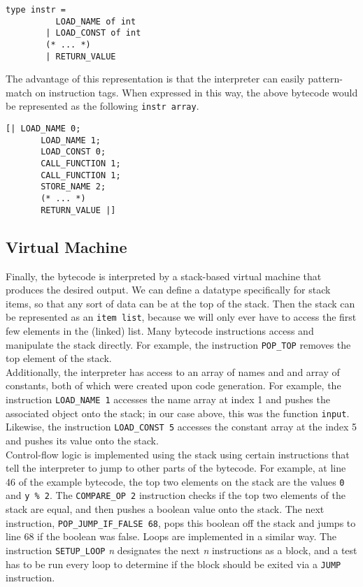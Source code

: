 \documentclass[11pt, twoside]{article}
\begin{document}
    \begin{lstlisting}[language=caml]
        type instr =
          LOAD_NAME of int
        | LOAD_CONST of int
        (* ... *)
        | RETURN_VALUE
    \end{lstlisting}
    The advantage of this representation is that the interpreter can easily pattern-match on instruction tags. When expressed in this way, the above bytecode would be represented as the following \texttt{instr array}.
    \begin{lstlisting}[language=caml]
    [| LOAD_NAME 0;
       LOAD_NAME 1;
       LOAD_CONST 0;
       CALL_FUNCTION 1;
       CALL_FUNCTION 1;
       STORE_NAME 2;
       (* ... *)
       RETURN_VALUE |]
    \end{lstlisting}
    \subsection{Virtual Machine}
    Finally, the bytecode is interpreted by a stack-based virtual machine that produces the desired output. We can define a datatype specifically for stack items, so that any sort of data can be at the top of the stack. Then the stack can be represented as an \texttt{item list}, because we will only ever have to access the first few elements in the (linked) list. Many bytecode instructions access and manipulate the stack directly. For example, the instruction \texttt{POP\_TOP} removes the top element of the stack.\\
    \indent Additionally, the interpreter has access to an array of names and and array of constants, both of which were created upon code generation. For example, the instruction \texttt{LOAD\_NAME 1} accesses the name array at index 1 and pushes the associated object onto the stack; in our case above, this was the function \texttt{input}. Likewise, the instruction \texttt{LOAD\_CONST 5} accesses the constant array at the index 5 and pushes its value onto the stack.\\
    \indent Control-flow logic is implemented using the stack using certain instructions that tell the interpreter to jump to other parts of the bytecode. For example, at line 46 of the example bytecode, the top two elements on the stack are the values \texttt{0} and \texttt{y \% 2}. The \texttt{COMPARE\_OP 2} instruction checks if the top two elements of the stack are equal, and then pushes a boolean value onto the stack. The next instruction, \texttt{POP\_JUMP\_IF\_FALSE 68}, pops this boolean off the stack and jumps to line 68 if the boolean was false. Loops are implemented in a similar way. The instruction \texttt{SETUP\_LOOP} \textit{n} designates the next \textit{n} instructions as a block, and a test has to be run every loop to determine if the block should be exited via a \texttt{JUMP} instruction.\\
\end{document}
